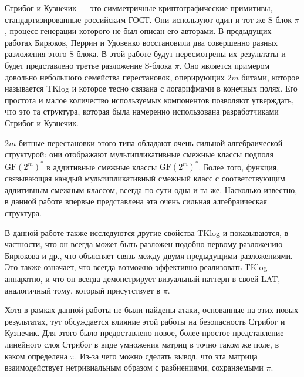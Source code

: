 \abstract

Стрибог и Кузнечик — это симметричные криптографические примитивы, стандартизированные российским ГОСТ. Они используют один и тот же S-блок \(\pi\), процесс генерации которого не был описан его авторами. В предыдущих работах Бирюков, Перрин и Удовенко восстановили два совершенно разных разложения этого S-блока. В этой работе будут пересмотрены их результаты и будет представлено третье разложение S-блока \(\pi\). Оно является примером довольно небольшого семейства перестановок, оперирующих \(2m\) битами, которое называется TKlog и которое тесно связана с логарифмами в конечных полях. Его простота и малое количество используемых компонентов позволяют утверждать, что это та структура, которая была намеренно использована разработчиками Стрибог и Кузнечик.

\(2m\)-битные перестановки этого типа обладают очень сильной алгебраической структурой: они отображают мультипликативные смежные классы подполя \(\text{GF}(2^m)^*\) в аддитивные смежные классы \(\text{GF}(2^m)^*\). Более того, функция, связывающая каждый мультипликативный смежный класс с соответствующим аддитивным смежным классом, всегда по сути одна и та же. Насколько известно, в данной работе впервые представлена эта очень сильная алгебраическая структура.

В данной работе также исследуются другие свойства TKlog и показываются, в частности, что он всегда может быть разложен подобно первому разложению Бирюкова и др., что объясняет связь между двумя предыдущими разложениями. Это также означает, что всегда возможно эффективно реализовать TKlog аппаратно, и что он всегда демонстрирует визуальный паттерн в своей LAT, аналогичный тому, который присутствует в \(\pi\).

Хотя в рамках данной работы не были найдены атаки, основанные на этих новых результатах, тут обсуждается влияние этой работы на безопасность Стрибог и Кузнечик. Для этого было предоставлено новое, более простое представление линейного слоя Стрибог в виде умножения матриц в точно таком же поле, в каком определена \(\pi\). Из-за чего можно сделать вывод, что эта матрица взаимодействует нетривиальным образом с разбиениями, сохраняемыми \(\pi\).
